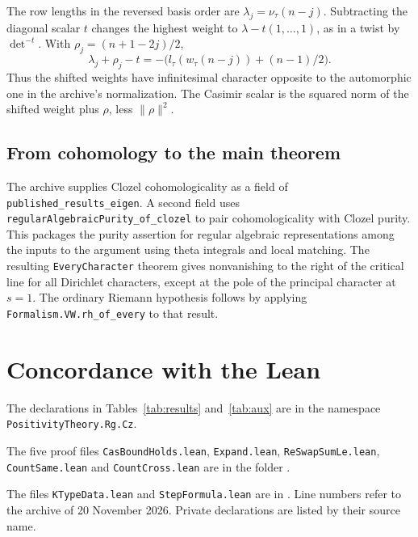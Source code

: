 \documentclass[11pt]{amsart}
\newcommand{\lean}[1]{\texttt{#1}}
\theoremstyle{definition}
\theoremstyle{remark}
\begin{document}
The row lengths in the reversed basis order are
\(\lambda_j=\nu_\tau(n-j)\). Subtracting the diagonal scalar \(t\)
changes the highest weight to \(\lambda-t(1,\ldots,1)\), as in a twist
by \(\det^{-t}\). With \(\rho_j=(n+1-2j)/2\),
\[
\lambda_j+\rho_j-t=-\bigl(l_\tau(w_\tau(n-j))+(n-1)/2\bigr).
\]
Thus the shifted weights have infinitesimal character opposite to the
automorphic one in the archive's normalization. The Casimir scalar is
the squared norm of the shifted weight plus \(\rho\), less
\(\|\rho\|^2\).

\subsection{From cohomology to the main theorem}

The archive supplies Clozel cohomologicality as a field of
\lean{published\_results\_eigen}. A second field uses
\lean{regularAlgebraicPurity\_\allowbreak{}of\_\allowbreak{}clozel} to pair cohomologicality with
Clozel purity. This packages the purity assertion for regular algebraic
representations among the inputs to the argument using theta integrals
and local matching. The resulting
\lean{EveryCharacter} theorem gives nonvanishing to the right of the
critical line for all Dirichlet characters, except at the pole of the
principal character at \(s=1\). The ordinary Riemann hypothesis follows by applying
\lean{Formalism.VW.rh\_of\_every} to that result.

\section{Concordance with the Lean}\label{sec:concordance}

The declarations in Tables~\ref{tab:results} and~\ref{tab:aux} are in the
namespace \lean{PositivityTheory.\allowbreak{}Rg.\allowbreak{}Cz}.

The five proof files \lean{CasBoundHolds.\allowbreak{}lean}, \lean{Expand.\allowbreak{}lean}, \lean{ReSwapSumLe.\allowbreak{}lean},
\lean{CountSame.\allowbreak{}lean} and \lean{CountCross.\allowbreak{}lean} are in the folder\newline
{}.

The files \lean{KTypeData.\allowbreak{}lean} and \lean{StepFormula.\allowbreak{}lean} are in
.
Line numbers refer to the archive of 20 November 2026. Private declarations
are listed by their source name.
\end{document}
